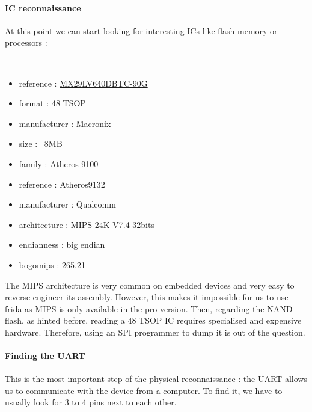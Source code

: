 \documentclass{article}
\begin{document}
\paragraph{IC reconnaissance} At this point we can start looking for interesting ICs like flash memory or processors :

\\
\begin{minipage}[t]{0.3\textwidth}
\end{minipage} %
\vspace{0.5cm}
\hfill
\begin{minipage}[t]{0.7\textwidth}
	\begin{itemize}
		\itemsep0em
		\item reference : \href{https://www.alldatasheet.com/datasheet-pdf/view/267962/MCNIX/MX29LV640DBTC-90G.html}{MX29LV640DBTC-90G}
		\item format : 48 TSOP
		\item manufacturer : Macronix
		\item size : ~8MB
	\end{itemize}
\end{minipage}
\begin{minipage}[t]{0.3\textwidth}
\end{minipage} %
\vspace{0.5cm}
\hfill
\begin{minipage}[t]{0.7\textwidth}
	\begin{itemize}
		\item family : Atheros 9100
		\item reference : Atheros9132
		\item manufacturer : Qualcomm
		\item architecture : MIPS 24K V7.4 32bits
		\item endianness : big endian
		\item bogomips : 265.21
	\end{itemize}
\end{minipage}
\noindent The MIPS architecture is very common on embedded devices and very easy to reverse engineer its assembly. However, this makes it impossible for us to use frida as MIPS is only available in the pro version. Then, regarding the NAND flash, as hinted before, reading a 48 TSOP IC requires specialised and expensive hardware. Therefore, using an SPI programmer to dump it is out of the question.
\paragraph{Finding the UART} This is the most important step of the physical reconnaissance : the UART allows us to communicate with the device from a computer. To find it, we have to usually look for 3 to 4 pins next to each other.
\end{document}

